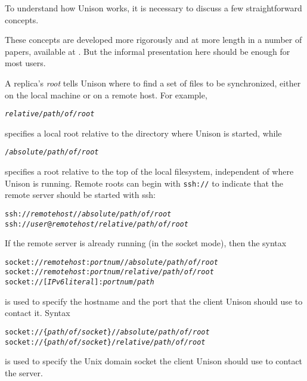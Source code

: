 \documentclass{article}
\newcommand{\NT}[1]{\textit{#1}}
\begin{document}

To understand how Unison works, it is necessary to discuss a few
straightforward concepts.

These concepts are developed more rigorously and at more length in a number
of papers, available at .
But the informal presentation here should be enough for most users.



A replica's {\em root} tells Unison where to find a set of files to be
synchronized, either on the local machine or on a remote host.
For example,
\begin{alltt}
      \NT{relative/path/of/root}
\end{alltt}
\noindent
specifies a local root relative to the directory where Unison is
started, while
\begin{alltt}
      /\NT{absolute/path/of/root}
\end{alltt}
\noindent
specifies a root relative to the top of the local filesystem,
independent of where Unison is running.  Remote roots can begin with
\verb|ssh://|
to indicate that the remote server should be started with ssh:
\begin{alltt}
      ssh://\NT{remotehost}//\NT{absolute/path/of/root}
      ssh://\NT{user}@\NT{remotehost}/\NT{relative/path/of/root}
\end{alltt}
If the remote server is already running (in the socket mode), then the syntax
\begin{alltt}
      socket://\NT{remotehost}:\NT{portnum}//\NT{absolute/path/of/root}
      socket://\NT{remotehost}:\NT{portnum}/\NT{relative/path/of/root}
      socket://[\NT{IPv6literal}]:\NT{portnum}/\NT{path}
\end{alltt}
\noindent
is used to specify the hostname and the port that the client Unison should
use to contact it.
Syntax
\begin{alltt}
      socket://\{\NT{path/of/socket}\}//\NT{absolute/path/of/root}
      socket://\{\NT{path/of/socket}\}/\NT{relative/path/of/root}
\end{alltt}
\noindent
is used to specify the Unix domain socket the client Unison should use to
contact the server.
\end{document}
